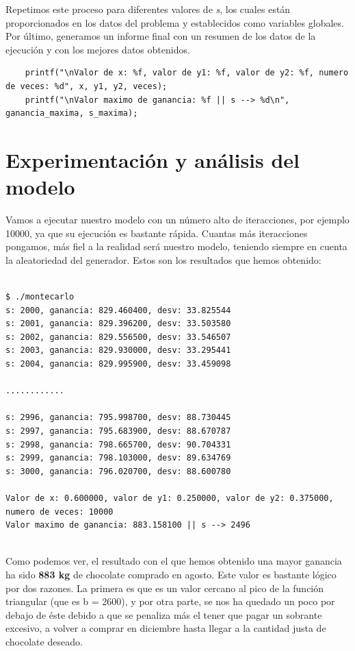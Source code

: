 \documentclass[11pt,a4paper]{article}
\begin{document}
Repetimos este proceso para diferentes valores de \textit{s}, los cuales están proporcionados en los datos del problema y establecidos como variables
globales. Por último, generamos un informe final con un resumen de los datos de la ejecución y con los mejores datos obtenidos.
\begin{lstlisting}
	printf("\nValor de x: %f, valor de y1: %f, valor de y2: %f, numero de veces: %d", x, y1, y2, veces);
	printf("\nValor maximo de ganancia: %f || s --> %d\n", ganancia_maxima, s_maxima);
\end{lstlisting}


\newpage
\section{Experimentación y análisis del modelo}

Vamos a ejecutar nuestro modelo con un número alto de iteracciones, por ejemplo 10000, ya que su ejecución es bastante rápida. Cuantas más iteracciones
pongamos, más fiel a la realidad será nuestro modelo, teniendo siempre en cuenta la aleatoriedad del generador. Estos son los resultados que hemos
obtenido:
\begin{lstlisting}

$ ./montecarlo
s: 2000, ganancia: 829.460400, desv: 33.825544
s: 2001, ganancia: 829.396200, desv: 33.503580
s: 2002, ganancia: 829.556500, desv: 33.546507
s: 2003, ganancia: 829.930000, desv: 33.295441
s: 2004, ganancia: 829.995900, desv: 33.459098

............

s: 2996, ganancia: 795.998700, desv: 88.730445
s: 2997, ganancia: 795.683900, desv: 88.670787
s: 2998, ganancia: 798.665700, desv: 90.704331
s: 2999, ganancia: 798.103000, desv: 89.634769
s: 3000, ganancia: 796.020700, desv: 88.600780

Valor de x: 0.600000, valor de y1: 0.250000, valor de y2: 0.375000,
numero de veces: 10000
Valor maximo de ganancia: 883.158100 || s --> 2496
	
\end{lstlisting}

Como podemos ver, el resultado con el que hemos obtenido una mayor ganancia ha sido \textbf{883 kg} de chocolate comprado en agosto. Este valor es
bastante lógico por dos razones. La primera es que es un valor cercano al pico de la función triangular (que es b = 2600), y por otra parte, se nos ha
quedado un poco por debajo de éste debido a que se penaliza más el tener que pagar un sobrante excesivo, a volver a comprar en diciembre hasta llegar a
la cantidad justa de chocolate deseado.
\end{document}
